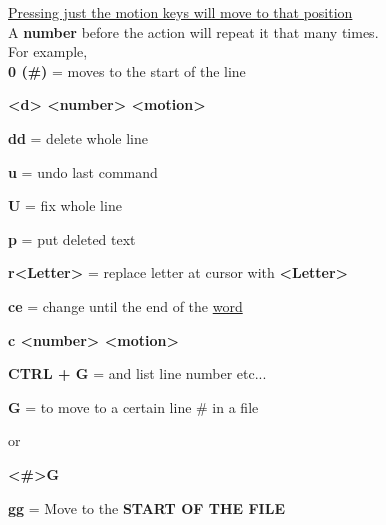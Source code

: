 \documentclass[12pt, letterpaper]{article}
\begin{document}
\begin{flushleft}
\underline{Pressing just the motion keys will move to that position} \\

A \textbf{number} before the action will repeat it that many times. \\

For example, \\

\textbf{0 (\#)} = moves to the start of the line \\
\par

\textbf{<d> <number> <motion>} \\
\par

\textbf{dd} = delete whole line \\
\par

\textbf{u} = undo last command \\
\par

\textbf{U} = fix whole line \\
\par

\textbf{p} = put deleted text \\
\par

\textbf{r<Letter>} = replace letter at cursor with \textbf{<Letter>} \\
\par

\textbf{ce} = change until the end of the \underline{word} \\
\par

\textbf{c <number> <motion> } \\
\par

\textbf{CTRL + G} =  and list line number etc... \\
\par

\textbf{G} = to move to a certain line \# in a file \\
\par
or \\
\par
\textbf{<\#>G} \\
\par

\textbf{gg} = Move to the \textbf{START OF THE FILE} \\
\par


\end{flushleft}
\end{document}
